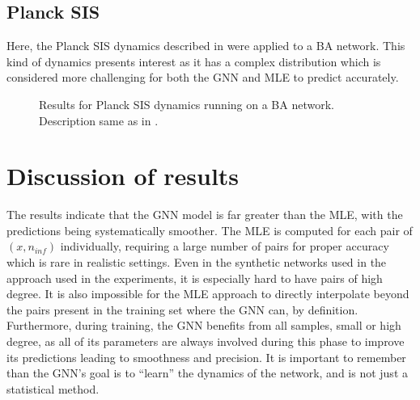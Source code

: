 \subsection{Planck SIS}

Here, the Planck SIS dynamics described in  were
applied to a BA network. This kind of dynamics presents interest as it
has a complex distribution which is considered more challenging for
both the GNN and MLE to predict accurately.

\begin{figure}[H]
  \centering
  \caption[Results for BA network running planck SIS dynamics]{
    Results for Planck SIS dynamics running on a BA
    network. Description same as in .
  }
  \label{fig:ba_plancksis}
\end{figure}

\newpage
\section{Discussion of results}\label{sec:discussion}

The results indicate that the GNN model is far greater than the MLE,
with the predictions being systematically smoother. The MLE is
computed for each pair of $(x, n_{inf})$ individually, requiring a
large number of pairs for proper accuracy which is rare in realistic
settings.  Even in the synthetic networks used in the approach used
in the experiments, it is especially hard to have pairs of high degree.
It is also impossible for the MLE approach to directly interpolate beyond
the pairs present in the training set where the GNN can, by definition.
Furthermore, during training, the GNN benefits from all samples, small or
high degree, as all of its parameters are always involved during this phase
to improve its predictions leading to smoothness and precision. It is important
to remember than the GNN's goal is to ``learn'' the dynamics of the network,
and is not just a statistical method. 

